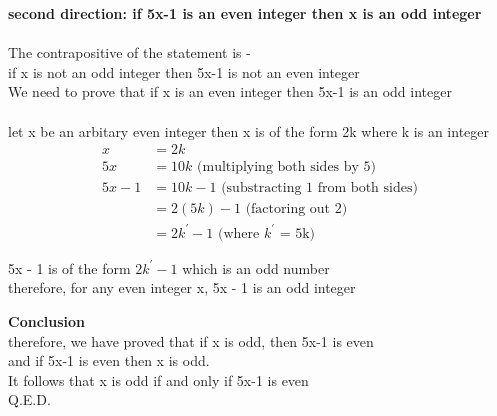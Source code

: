 \documentclass[11pt]{article}
\begin{document}
{{{\noindent
\textbf{second direction: if 5x-1 is an even integer then x is an odd integer} \\
\\
The contrapositive of the statement is - \\
if x is not an odd integer then 5x-1 is not an even integer \\
We need to prove that
if x is an even integer then 5x-1 is an odd integer \\
\\
let x be an arbitary even integer then x is of the form 2k
where k is an integer \\
\begin{align*}
    x &= 2k \\
    5x &= 10k \text{  (multiplying both sides by 5)} \\
    5x - 1 &= 10k - 1 \text{  (substracting 1 from both sides)}  \\
    &= 2(5k)  - 1 \text{  (factoring out 2)} \\
    &= 2k^{\prime} - 1 \text{  (where $k^{\prime}$ = 5k)}
\end{align*}

\noindent
5x - 1 is of the form $2k^{\prime} - 1$ which is an odd number \\
therefore, for any even integer x, 5x - 1 is an odd integer

\newpage
\noindent
\textbf{Conclusion} \\
therefore, we have proved that if x is odd, then 5x-1 is even \\
and if 5x-1 is even then x is odd. \\
It follows that x is odd if and only if 5x-1 is even \\
Q.E.D.

}}}
\end{document}
